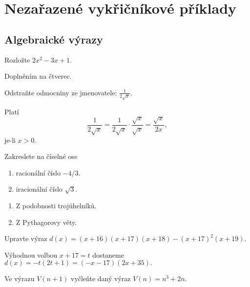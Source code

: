 \section{Nezařazené vykřičníkové příklady}
\subsection{Algebraické výrazy}
\begin{priklad}
    Rozložte $2x^2 - 3x+1.$
\end{priklad}

\begin{reseni}
Doplněním na čtverec.
\end{reseni}

\begin{priklad}
Odstraňte odmocniny ze jmenovatele: $\frac{1}{2 \sqrt{x} }.$
\end{priklad}

\begin{reseni}
Platí
$$\frac{1}{2\sqrt{x} }=\frac{1}{2\sqrt{x} }\cdot \frac{\sqrt{x} }{\sqrt{x} }=\frac{\sqrt{x} }{2x},$$
je-li $x>0.$
\end{reseni}

\begin{priklad}
    Zakreslete na číselné ose
    \begin{enumerate}[$a.$]
    \item racionální číslo $-4/3.$
   	\item iracionální číslo $\sqrt{3}. $
    \end{enumerate}
\end{priklad}

\begin{reseni}
\begin{enumerate}[$a.$]
\item Z podobnosti trojúhelníků.
\item Z Pythagorovy věty.
\end{enumerate}
\end{reseni}

\begin{priklad}
    Upravte výraz $d(x)=(x+16)(x+17)(x+18)-(x+17)^2(x+19).$
\end{priklad}

\begin{reseni}
 Výhodnou volbou $x+17=t$ dostaneme $d(x)=-t(2t+1)=(-x-17)(2x+35).$
\end{reseni}

\begin{priklad}
    Ve výrazu $V(n+1)$ vyčleňte daný výraz $V(n)=n^3+2n.$
\end{priklad}

